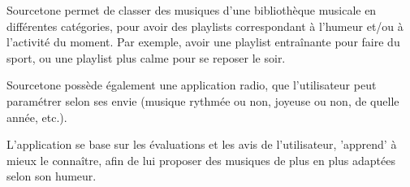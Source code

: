 Sourcetone permet de classer des musiques d'une bibliothèque musicale en différentes catégories, pour avoir des playlists correspondant à l'humeur et/ou à l'activité du moment. Par exemple, avoir une playlist entraînante pour faire du sport, ou une playlist plus calme pour se reposer le soir.

Sourcetone possède également une application radio, que l'utilisateur peut paramétrer selon ses envie (musique rythmée ou non, joyeuse ou non, de quelle année, etc.).

L'application se base sur les évaluations et les avis de l'utilisateur, 'apprend' à mieux le connaître, afin de lui proposer des musiques de plus en plus adaptées selon son humeur.

